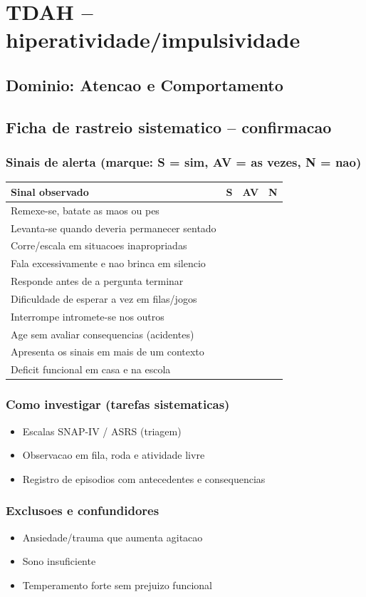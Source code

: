 \documentclass[a4paper,11pt]{book}
\begin{document}
\chapter{TDAH -- hiperatividade/impulsividade}
\section*{Dominio: Atencao e Comportamento}
\section*{Ficha de rastreio sistematico -- confirmacao}
\subsection*{Sinais de alerta (marque: S = sim, AV = as vezes, N = nao)}
\begin{tabular}{@{}p{11.5cm}ccc@{}}\toprule
Sinal observado & S & AV & N \\\midrule
Remexe-se, batate as maos ou pes & & & \\
Levanta-se quando deveria permanecer sentado & & & \\
Corre/escala em situacoes inapropriadas & & & \\
Fala excessivamente e nao brinca em silencio & & & \\
Responde antes de a pergunta terminar & & & \\
Dificuldade de esperar a vez em filas/jogos & & & \\
Interrompe intromete-se nos outros & & & \\
Age sem avaliar consequencias (acidentes) & & & \\
Apresenta os sinais em mais de um contexto & & & \\
Deficit funcional em casa e na escola & & & \\
\bottomrule\end{tabular}
\subsection*{Como investigar (tarefas sistematicas)}
\begin{itemize}
\item Escalas SNAP-IV / ASRS (triagem)
\item Observacao em fila, roda e atividade livre
\item Registro de episodios com antecedentes e consequencias
\end{itemize}
\subsection*{Exclusoes e confundidores}
\begin{itemize}
\item Ansiedade/trauma que aumenta agitacao
\item Sono insuficiente
\item Temperamento forte sem prejuizo funcional
\end{itemize}
\end{document}
